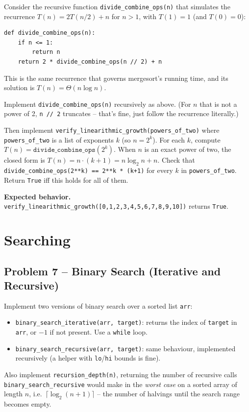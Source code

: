 \documentclass[11pt]{article}
\begin{document}
Consider the recursive function \texttt{divide\_combine\_ops(n)} that simulates the
recurrence $T(n) = 2T(n/2) + n$ for $n > 1$, with $T(1) = 1$ (and $T(0)=0$):
\begin{lstlisting}
def divide_combine_ops(n):
    if n <= 1:
        return n
    return 2 * divide_combine_ops(n // 2) + n
\end{lstlisting}
This is the same recurrence that governs mergesort's running time, and its solution is
$T(n) = \Theta(n \log n)$.

Implement \texttt{divide\_combine\_ops(n)} recursively as above. (For $n$ that is not a
power of 2, \texttt{n // 2} truncates -- that's fine, just follow the recurrence
literally.)

Then implement \texttt{verify\_linearithmic\_growth(powers\_of\_two)} where
\texttt{powers\_of\_two} is a list of exponents $k$ (so $n = 2^k$). For each $k$, compute
$T(n) = \texttt{divide\_combine\_ops}(2^k)$. When $n$ is an exact power of two, the closed
form is $T(n) = n \cdot (k+1) = n \log_2 n + n$. Check that
\texttt{divide\_combine\_ops(2**k) == 2**k * (k+1)} for every $k$ in
\texttt{powers\_of\_two}. Return \texttt{True} iff this holds for all of them.

\textbf{Expected behavior.} \texttt{verify\_linearithmic\_growth([0,1,2,3,4,5,6,7,8,9,10])}
returns \texttt{True}.

\newpage
\section{Searching}

\subsection*{Problem 7 -- Binary Search (Iterative and Recursive)}

Implement two versions of binary search over a sorted list \texttt{arr}:
\begin{itemize}
    \item \texttt{binary\_search\_iterative(arr, target)}: returns the index of
    \texttt{target} in \texttt{arr}, or $-1$ if not present. Use a \texttt{while} loop.
    \item \texttt{binary\_search\_recursive(arr, target)}: same behaviour, implemented
    recursively (a helper with \texttt{lo}/\texttt{hi} bounds is fine).
\end{itemize}
Also implement \texttt{recursion\_depth(n)}, returning the number of recursive calls
\texttt{binary\_search\_recursive} would make in the \emph{worst case} on a sorted array of
length $n$, i.e.\ $\lceil \log_2(n+1) \rceil$ -- the number of halvings until the search
range becomes empty.
\end{document}
